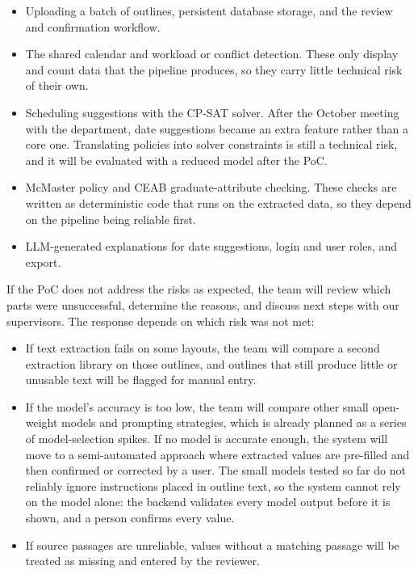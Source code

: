 \documentclass{article}
\begin{document}
\begin{itemize}
  \item Uploading a batch of outlines, persistent database storage, and the
  review and confirmation workflow.
  \item The shared calendar and workload or conflict detection. These only
  display and count data that the pipeline produces, so they carry little
  technical risk of their own.
  \item Scheduling suggestions with the CP-SAT solver. After the October
  meeting with the department, date suggestions became an extra feature rather
  than a core one. Translating policies into solver constraints is still a
  technical risk, and it will be evaluated with a reduced model after the PoC.
  \item McMaster policy and CEAB graduate-attribute checking. These checks
  are written as deterministic code that runs on the extracted data, so they
  depend on the pipeline being reliable first.
  \item LLM-generated explanations for date suggestions, login and user
  roles, and export.
\end{itemize}

\bigskip
If the PoC does not address the risks as expected, the team will review which
parts were unsuccessful, determine the reasons, and discuss next steps with
our supervisors. The response depends on which risk was not met:

\begin{itemize}
  \item If text extraction fails on some layouts, the team will compare a
  second extraction library on those outlines, and outlines that still produce
  little or unusable text will be flagged for manual entry.
  \item If the model's accuracy is too low, the team will compare other small
  open-weight models and prompting strategies, which is already planned as a
  series of model-selection spikes. If no model is accurate enough, the system
  will move to a semi-automated approach where extracted values are pre-filled
  and then confirmed or corrected by a user. The small models tested so far
  do not reliably ignore instructions placed in outline text, so the system
  cannot rely on the model alone: the backend validates every model output
  before it is shown, and a person confirms every value.
  \item If source passages are unreliable, values without a matching passage
  will be treated as missing and entered by the reviewer.
\end{itemize}
\end{document}
